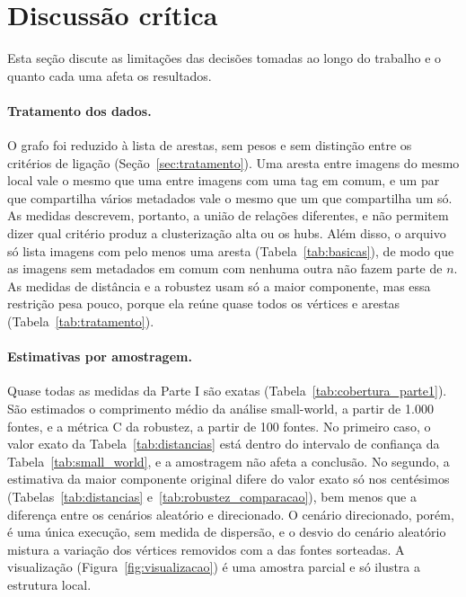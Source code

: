 \section{Discussão crítica}
\label{sec:discussao}

Esta seção discute as limitações das decisões tomadas ao longo do trabalho e o quanto cada uma afeta os resultados.

\paragraph{Tratamento dos dados.} O grafo foi reduzido à lista de arestas, sem pesos e sem distinção entre os critérios de ligação (Seção~\ref{sec:tratamento}). Uma aresta entre imagens do mesmo local vale o mesmo que uma entre imagens com uma tag em comum, e um par que compartilha vários metadados vale o mesmo que um que compartilha um só. As medidas descrevem, portanto, a união de relações diferentes, e não permitem dizer qual critério produz a clusterização alta ou os hubs. Além disso, o arquivo só lista imagens com pelo menos uma aresta (Tabela~\ref{tab:basicas}), de modo que as imagens sem metadados em comum com nenhuma outra não fazem parte de $n$. As medidas de distância e a robustez usam só a maior componente, mas essa restrição pesa pouco, porque ela reúne quase todos os vértices e arestas (Tabela~\ref{tab:tratamento}).

\paragraph{Estimativas por amostragem.} Quase todas as medidas da Parte I são exatas (Tabela~\ref{tab:cobertura_parte1}). São estimados o comprimento médio da análise small-world, a partir de 1.000 fontes, e a métrica C da robustez, a partir de 100 fontes. No primeiro caso, o valor exato da Tabela~\ref{tab:distancias} está dentro do intervalo de confiança da Tabela~\ref{tab:small_world}, e a amostragem não afeta a conclusão. No segundo, a estimativa da maior componente original difere do valor exato só nos centésimos (Tabelas~\ref{tab:distancias} e~\ref{tab:robustez_comparacao}), bem menos que a diferença entre os cenários aleatório e direcionado. O cenário direcionado, porém, é uma única execução, sem medida de dispersão, e o desvio do cenário aleatório mistura a variação dos vértices removidos com a das fontes sorteadas. A visualização (Figura~\ref{fig:visualizacao}) é uma amostra parcial e só ilustra a estrutura local.

